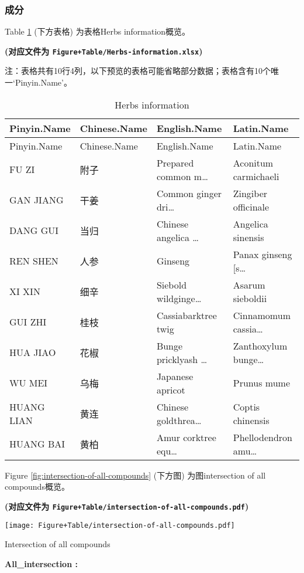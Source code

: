 \documentclass[
]{article}
\begin{document}
\hypertarget{ux6210ux5206}{%
\subsubsection{成分}\label{ux6210ux5206}}

Table \ref{tab:Herbs-information} (下方表格) 为表格Herbs information概览。

\textbf{(对应文件为 \texttt{Figure+Table/Herbs-information.xlsx})}

\begin{center}\begin{tcolorbox}[colback=gray!10, colframe=gray!50, width=0.9\linewidth, arc=1mm, boxrule=0.5pt]注：表格共有10行4列，以下预览的表格可能省略部分数据；表格含有10个唯一`Pinyin.Name'。
\end{tcolorbox}
\end{center}

\begin{longtable}[]{@{}llll@{}}
\caption{\label{tab:Herbs-information}Herbs information}\tabularnewline
\toprule
Pinyin.Name & Chinese.Name & English.Name & Latin.Name\tabularnewline
\midrule
\endfirsthead
\toprule
Pinyin.Name & Chinese.Name & English.Name & Latin.Name\tabularnewline
\midrule
\endhead
FU ZI & 附子 & Prepared common m\ldots{} & Aconitum carmichaeli\tabularnewline
GAN JIANG & 干姜 & Common ginger dri\ldots{} & Zingiber officinale\tabularnewline
DANG GUI & 当归 & Chinese angelica \ldots{} & Angelica sinensis\tabularnewline
REN SHEN & 人参 & Ginseng & Panax ginseng {[}s\ldots{}\tabularnewline
XI XIN & 细辛 & Siebold wildginge\ldots{} & Asarum sieboldii\tabularnewline
GUI ZHI & 桂枝 & Cassiabarktree twig & Cinnamomum cassia\ldots{}\tabularnewline
HUA JIAO & 花椒 & Bunge pricklyash \ldots{} & Zanthoxylum bunge\ldots{}\tabularnewline
WU MEI & 乌梅 & Japanese apricot & Prunus mume\tabularnewline
HUANG LIAN & 黄连 & Chinese goldthrea\ldots{} & Coptis chinensis\tabularnewline
HUANG BAI & 黄柏 & Amur corktree equ\ldots{} & Phellodendron amu\ldots{}\tabularnewline
\bottomrule
\end{longtable}

Figure \ref{fig:intersection-of-all-compounds} (下方图) 为图intersection of all compounds概览。

\textbf{(对应文件为 \texttt{Figure+Table/intersection-of-all-compounds.pdf})}

\def\@captype{figure}
\begin{center}
\texttt{[image: Figure+Table/intersection-of-all-compounds.pdf]}
\caption{Intersection of all compounds}\label{fig:intersection-of-all-compounds}
\end{center}
\begin{center}\begin{tcolorbox}[colback=gray!10, colframe=gray!50, width=0.9\linewidth, arc=1mm, boxrule=0.5pt]
\textbf{
All\_intersection
:}

\vspace{0.5em}



\vspace{2em}
\end{tcolorbox}
\end{center}
\end{document}
